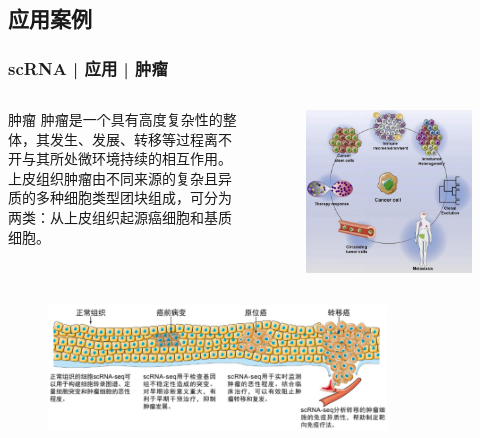\documentclass[11pt]{ctexbeamer}
\begin{document}
\subsection{应用案例}
\begin{frame}
  \frametitle{scRNA | 应用 | 肿瘤}
  \begin{columns}
    \begin{block}{肿瘤}
  肿瘤是一个具有高度复杂性的整体，其发生、发展、转移等过程离不开与其所处微环境持续的相互作用。\\
  上皮组织肿瘤由不同来源的复杂且异质的多种细胞类型团块组成，可分为两类：从上皮组织起源癌细胞和\alert{基质细胞}。
  \end{block}
    \begin{figure}
    \centering
    \includegraphics[width=\textwidth]{tumor_01.png}
  \end{figure}
  \end{columns}
    \begin{figure}
    \centering
    \includegraphics[width=0.8\textwidth]{tumor_02.png}
  \end{figure}
\end{frame}
\end{document}
